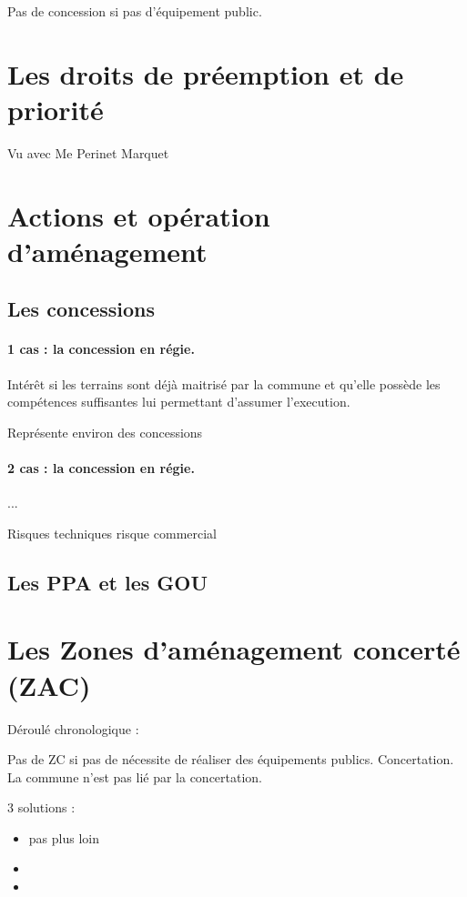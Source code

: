	Pas de concession si pas d'équipement public.

\section{Les droits de préemption et de priorité}

	Vu avec Me Perinet Marquet

\section{Actions et opération d'aménagement}

	\subsection{Les concessions}

		\paragraph{1\ier{} cas : la concession en régie.}

		Intérêt si les terrains sont déjà maitrisé par la commune et qu'elle possède les compétences suffisantes lui permettant d'assumer l'execution.

		Représente environ  des concessions

		\paragraph{2\ieme{} cas : la concession en régie.}

		...

		Risques techniques
		risque commercial

	\subsection{Les PPA et les GOU}

\section{Les Zones d'aménagement concerté (ZAC)}

	Déroulé chronologique :

	Pas de ZC si pas de nécessite de réaliser des équipements publics.
	Concertation. La commune n'est pas lié par la concertation.

	3 solutions :
	\begin{itemize}
		\item pas plus loin
		\item
		\item
	\end{itemize}


